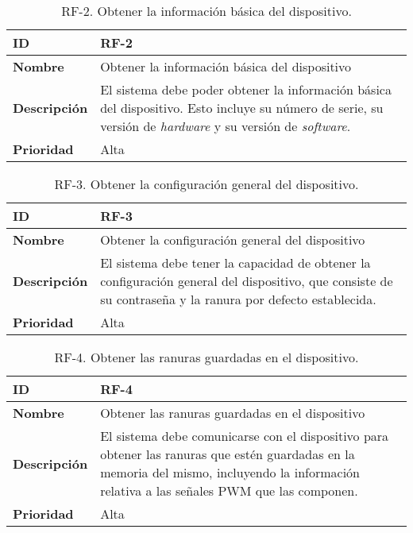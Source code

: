 \begin{table}[h!]
    \centering
    \begin{tabular}{|m{2.5cm}|m{9.27cm}|}
        \hline
        \textbf{ID} & RF-2 \\
        \hline
        \textbf{Nombre} & Obtener la información básica del dispositivo \\
        \hline
        \textbf{Descripción} & El sistema debe poder obtener la información básica del dispositivo. Esto incluye su número de serie, su versión de \textit{hardware} y su versión de \textit{software}. \\
        \hline
        \textbf{Prioridad} & Alta \\
        \hline
    \end{tabular}
    \caption{RF-2. Obtener la información básica del dispositivo.}
\end{table}

\begin{table}[h!]
    \centering
    \begin{tabular}{|m{2.5cm}|m{9.27cm}|}
        \hline
        \textbf{ID} & RF-3 \\
        \hline
        \textbf{Nombre} & Obtener la configuración general del dispositivo \\
        \hline
        \textbf{Descripción} & El sistema debe tener la capacidad de obtener la configuración general del dispositivo, que consiste de su contraseña y la ranura por defecto establecida. \\
        \hline
        \textbf{Prioridad} & Alta \\
        \hline
    \end{tabular}
    \caption{RF-3. Obtener la configuración general del dispositivo.}
\end{table}

\begin{table}[h!]
    \centering
    \begin{tabular}{|m{2.5cm}|m{9.27cm}|}
        \hline
        \textbf{ID} & RF-4 \\
        \hline
        \textbf{Nombre} & Obtener las ranuras guardadas en el dispositivo \\
        \hline
        \textbf{Descripción} & El sistema debe comunicarse con el dispositivo para obtener las ranuras que estén guardadas en la memoria del mismo, incluyendo la información relativa a las señales PWM que las componen. \\
        \hline
        \textbf{Prioridad} & Alta \\
        \hline
    \end{tabular}
    \caption{RF-4. Obtener las ranuras guardadas en el dispositivo.}
\end{table}

